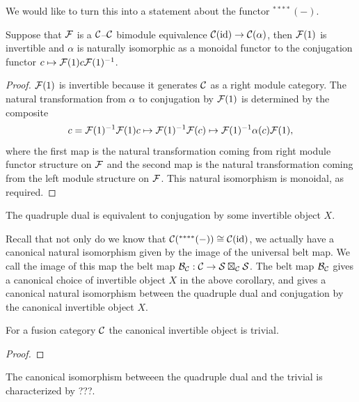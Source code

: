 \documentclass{amsart}
\begin{document}
We would like to turn this into a statement about the functor ${}^{****}(-)$.

\begin{lemma}
Suppose that $\mathcal F$ is a $\mathcal C$--$\mathcal C$ bimodule equivalence $\mathcal C(\mathrm{id}) \rightarrow \mathcal C(\alpha)$, then $\mathcal F(1)$ is invertible and $\alpha$ is naturally isomorphic as a monoidal functor to the conjugation functor $c \mapsto \mathcal F(1) c \mathcal F(1)^{-1}$.  
\end{lemma}
\begin{proof}
$\mathcal F(1)$ is invertible because it generates $\mathcal C$ as a right module category.  The natural transformation from $\alpha$ to conjugation by $\mathcal F(1)$ is determined by the composite $$c = \mathcal F(1)^{-1} \mathcal F(1) c \mapsto \mathcal F(1)^{-1} \mathcal F(c) \mapsto \mathcal F(1)^{-1} \alpha(c) \mathcal F(1),$$ where the first map is the natural transformation coming from right module functor structure on $\mathcal F$ and the second map is the natural transformation coming from the left module structure on $\mathcal F$.  This natural isomorphism is monoidal, as required.  
\end{proof}

\begin{corollary}
The quadruple dual is equivalent to conjugation by some invertible object $X$.
\end{corollary}

Recall that not only do we know that $\mathcal C({}^{****}(-)) \cong \mathcal C(\mathrm{id})$, we actually have a canonical natural isomorphism given by the image of the universal belt map.  We call the image of this map the belt map $\mathcal B_\mathcal C: \mathcal C \rightarrow \mathcal S \boxtimes_\mathcal C \mathcal S$.  The belt map $\mathcal B_\mathcal C$ gives a canonical choice of invertible object $X$ in the above corollary, and gives a canonical natural isomorphism between the quadruple dual and conjugation by the canonical invertible object $X$.

\begin{theorem} 
For a fusion category $\mathcal C$ the canonical invertible object is trivial.
\end{theorem}
\begin{proof}
\end{proof}

\begin{theorem}
The canonical isomorphism betweeen the quadruple dual and the trivial is characterized by ???.
\end{theorem}
\end{document}
